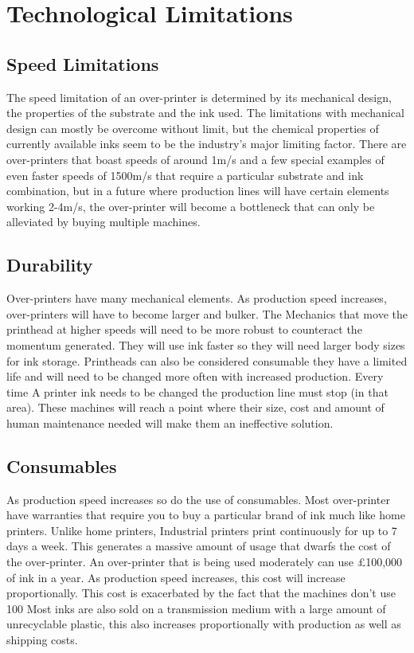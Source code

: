 \chapter{Technological Limitations}
\pagestyle{fancy}

\section{Speed Limitations}
The speed limitation of an over-printer is determined by its mechanical design, the properties of the substrate and the ink used. The limitations with mechanical design can mostly be overcome without limit, but the chemical properties of currently available inks seem to be the industry's major limiting factor. 
There are over-printers that boast speeds of around 1m/s and a few special examples of even faster speeds of 1500m/s that require a particular substrate and ink combination, but in a future where production lines will have certain elements working  2-4m/s, the over-printer will become a bottleneck that can only be alleviated by buying multiple machines.

\section{Durability}
Over-printers have many mechanical elements. As production speed increases, over-printers will have to become larger and bulker.  The Mechanics that move the printhead at higher speeds will need to be more robust to counteract the momentum generated. They will use ink faster so they will need larger body sizes for ink storage.
Printheads can also be considered consumable they have a limited life and will need to be changed more often with increased production. Every time A printer ink needs to be changed the production line must stop (in that area).
These machines will reach a point where their size, cost and amount of human maintenance needed will make them an ineffective solution.

\section{Consumables}

As production speed increases so do the use of consumables. Most over-printer have warranties that require you to buy a particular brand of ink much like home printers. Unlike home printers, Industrial printers print continuously for up to 7 days a week. This generates a massive amount of usage that dwarfs the cost of the over-printer. An over-printer that is being used moderately can use £100,000 of ink in a year. As production speed increases, this cost will increase proportionally.
This cost is exacerbated by the fact that the machines don’t use 100%
Most inks are also sold on a transmission medium with a large amount of unrecyclable plastic, this also increases proportionally with production as well as shipping costs.





